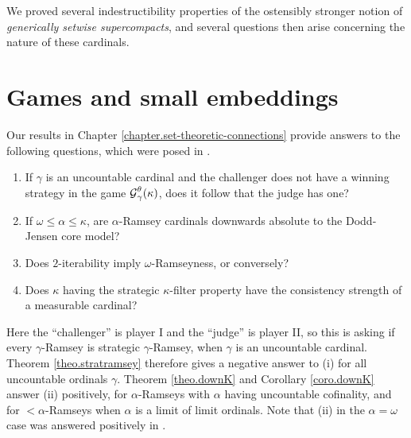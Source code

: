 \documentclass[../../main]{subfiles}
\begin{document}
We proved several indestructibility properties of the ostensibly stronger notion of \textit{generically setwise supercompacts}, and several questions then arise concerning the nature of these cardinals.






\section{Games and small embeddings}

Our results in Chapter \ref{chapter.set-theoretic-connections} provide answers to the following questions, which were posed in \cite{HolySchlicht}.

\begin{enumerate}
	\item If $\gamma$ is an uncountable cardinal and the challenger does not have a winning strategy in the game $\operatorname{\mathcal G}_\gamma^\theta(\kappa)$, does it follow that the judge has one?
	\item If $\omega\leq\alpha\leq\kappa$, are $\alpha$-Ramsey cardinals downwards absolute to the Dodd-Jensen core model?
	\item Does $2$-iterability imply $\omega$-Ramseyness, or conversely?
	\item Does $\kappa$ having the strategic $\kappa$-filter property have the consistency strength of a measurable cardinal?\\
\end{enumerate}

Here the ``challenger'' is player I and the ``judge'' is player II, so this is asking if every $\gamma$-Ramsey is strategic $\gamma$-Ramsey, when $\gamma$ is an uncountable cardinal. Theorem \ref{theo.stratramsey} therefore gives a negative answer to (i) for all uncountable ordinals $\gamma$. Theorem \ref{theo.downK} and Corollary \ref{coro.downK} answer (ii) positively, for $\alpha$-Ramseys with $\alpha$ having uncountable cofinality, and for ${<}\alpha$-Ramseys when $\alpha$ is a limit of limit ordinals. Note that (ii) in the $\alpha=\omega$ case was answered positively in \cite{HolySchlicht}.
\end{document}
